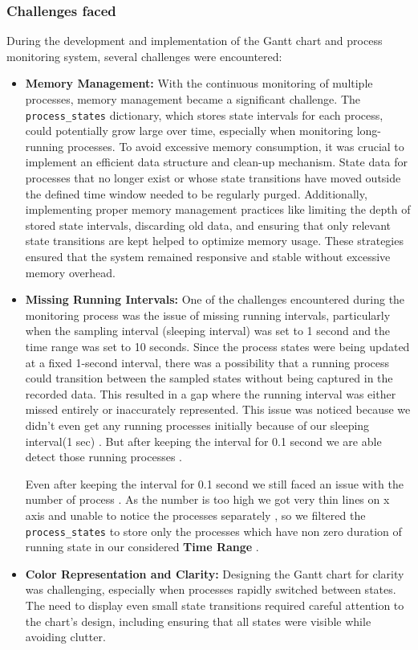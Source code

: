 \documentclass[12pt]{article}
\begin{document}
\subsubsection{Challenges faced}

During the development and implementation of the Gantt chart and process monitoring system, several challenges were encountered:

\begin{itemize}
     \item \textbf{Memory Management:} With the continuous monitoring of multiple processes, memory management became a significant challenge. The \texttt{process\_states} dictionary, which stores state intervals for each process, could potentially grow large over time, especially when monitoring long-running processes. To avoid excessive memory consumption, it was crucial to implement an efficient data structure and clean-up mechanism. State data for processes that no longer exist or whose state transitions have moved outside the defined time window needed to be regularly purged. Additionally, implementing proper memory management practices like limiting the depth of stored state intervals, discarding old data, and ensuring that only relevant state transitions are kept helped to optimize memory usage. These strategies ensured that the system remained responsive and stable without excessive memory overhead.

     \item \textbf{Missing Running Intervals:} One of the challenges encountered during the monitoring process was the issue of missing running intervals, particularly when the sampling interval (sleeping interval) was set to 1 second and the time range was set to 10 seconds. Since the process states were being updated at a fixed 1-second interval, there was a possibility that a running process could transition between the sampled states without being captured in the recorded data. This resulted in a gap where the running interval was either missed entirely or inaccurately represented. This issue was noticed because we didn't even get any running processes initially because of our sleeping interval(1 sec) . But after keeping the interval for 0.1 second we are able detect those running processes .

     Even after keeping the interval for 0.1 second we still faced an issue with the number of process . As the number is too high we got very thin lines on x axis and unable to notice the processes separately , so we filtered the \texttt{process\_states} to store only the processes which have non zero duration of running state in our considered \textbf{Time Range} .

     \item \textbf{Color Representation and Clarity:} Designing the Gantt chart for clarity was challenging, especially when processes rapidly switched between states. The need to display even small state transitions required careful attention to the chart's design, including ensuring that all states were visible while avoiding clutter.
\end{itemize}
\end{document}
